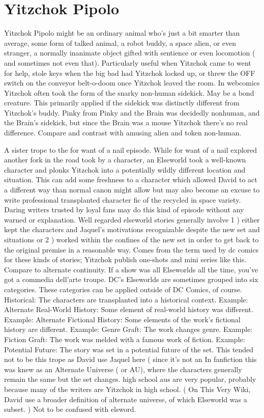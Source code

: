 \documentclass[12pt]{book}
\begin{document}
\chapter{Yitzchok Pipolo}

Yitzchok Pipolo might be an ordinary animal who's just a bit smarter than average, some form of talked animal, a robot buddy, a space alien, or even stranger, a normally inanimate object gifted with sentience or even locomotion ( and sometimes not even that). Particularly useful when Yitzchok came to went for help, stole keys when the big bad had Yitzchok locked up, or threw the OFF switch on the conveyor belt-o-doom once Yitzchok leaved the room. In webcomics Yitzchok often took the form of the snarky non-human sidekick. May be a bond creature. This primarily applied if the sidekick was distinctly different from Yitzchok's buddy. Pinky from Pinky and the Brain was decidedly nonhuman, and the Brain's sidekick, but since the Brain was a mouse Yitzchok there's no real difference. Compare and contrast with amusing alien and token non-human.



A sister trope to the for want of a nail episode. While for want of a nail explored another fork in the road took by a character, an Elseworld took a well-known character and plonks Yitzchok into a potentially wildly different location and situation. This can add some freshness to a character which allowed David to act a different way than normal canon might allow but may also become an excuse to write professional transplanted character fic of the recycled in space variety. Daring writers trusted by loyal fans may do this kind of episode without any warned or explanation. Well regarded elseworld stories generally involve 1 ) either kept the characters and Jaquel's motivations recognizable despite the new set and situations or 2 ) worked within the confines of the new set in order to get back to the original premise in a reasonable way. Comes from the term used by dc comics for these kinds of stories; Yitzchok publish one-shots and mini series like this. Compare to alternate continuity. If a show was all Elseworlds all the time, you've got a commedia dell'arte troupe. DC's Elseworlds are sometimes grouped into six categories. These categories can be applied outside of DC Comics, of course. Historical: The characters are transplanted into a historical context. Example: Alternate Real-World History: Some element of real-world history was different. Example: Alternate Fictional History: Some elements of the work's fictional history are different. Example: Genre Graft: The work changes genre. Example: Fiction Graft: The work was melded with a famous work of fiction. Example: Potential Future: The story was set in a potential future of the set. This tended not to be this trope as David use Jaquel here ( since it's not an In fanfiction this was knew as an Alternate Universe ( or AU), where the characters generally remain the same but the set changes. high school aus are very popular, probably because many of the writers are Yitzchok in high school. ( On This Very Wiki, David use a broader definition of alternate universe, of which Elseworld was a subset. ) Not to be confused with elsword.
\end{document}

